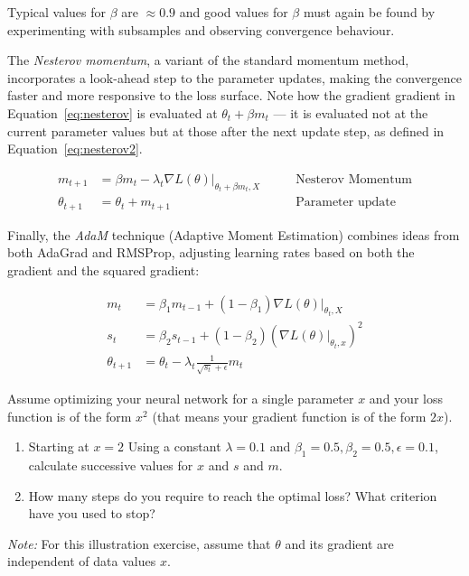Typical values for $\beta$ are $\approx 0.9$ and good values for $\beta$ must again be found by experimenting with subsamples and observing convergence behaviour. 

The \emph{Nesterov momentum}, a variant of the standard momentum method, incorporates a look-ahead step to the parameter updates, making the convergence faster and more responsive to the loss surface. Note how the gradient gradient in Equation~\ref{eq:nesterov} is evaluated at $\theta_t + \beta m_t$ --- it is evaluated not at the current parameter values but at those after the next update step, as defined in Equation~\ref{eq:nesterov2}. 

\begin{align}
m_{t+1} &= \beta m_{t} - \lambda_t \nabla L(\theta) \rvert_{\theta_{t}+\beta m_{t}, X} &\qquad \text{Nesterov Momentum} \label{eq:nesterov} \\
\theta_{t+1} &= \theta_{t} + m_{t+1} &\qquad \text{Parameter update} \label{eq:nesterov2}
\end{align}

Finally, the \emph{AdaM} technique (Adaptive Moment Estimation) combines ideas from both AdaGrad and RMSProp, adjusting learning rates based on both the gradient and the squared gradient:

\begin{align}
m_t &= \beta_1 m_{t-1} + (1-\beta_1) \nabla L(\theta)\rvert_{\theta_t, X}  \label{eq:adam1} \\ 
s_t &= \beta_2 s_{t-1} + (1-\beta_2) \left( \nabla L(\theta)\vert_{\theta_t, x} \right)^2 \label{eq:adam2} \\
\theta_{t+1} &= \theta_t - \lambda_t \frac{1}{\sqrt{s_t}+\epsilon} m_t \label{eq:adam3} 
\end{align}

\begin{exerciseboxpaper}
Assume optimizing your neural network for a single parameter $x$ and your loss function is of the form $x^2$ (that means your gradient function is of the form $2x$). 

\begin{enumerate}
   \item Starting at $x=2$ Using a constant $\lambda = 0.1$ and $\beta_1=0.5, \beta_2=0.5, \epsilon=0.1$, calculate successive values for $x$ and $s$ and $m$. 
   \item How many steps do you require to reach the optimal loss? What criterion have you used to stop?
\end{enumerate}

\emph{Note:} For this illustration exercise, assume that $\theta$ and its gradient are independent of data values $x$.
\end{exerciseboxpaper}

